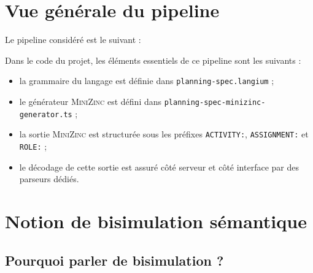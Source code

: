 \documentclass[12pt,a4paper]{article}
\newcommand{\DSL}{\textsc{PlanningSpec}}
\newcommand{\MZN}{\textsc{MiniZinc}}
\begin{document}
\section{Vue générale du pipeline}

Le pipeline considéré est le suivant :

\begin{center}
\end{center}

Dans le code du projet, les éléments essentiels de ce pipeline sont les suivants :

\begin{itemize}[leftmargin=1.2cm]
  \item la grammaire du langage est définie dans \texttt{planning-spec.langium} ;
  \item le générateur \MZN{} est défini dans \texttt{planning-spec-minizinc-generator.ts} ;
  \item la sortie \MZN{} est structurée sous les préfixes \texttt{ACTIVITY:}, \texttt{ASSIGNMENT:} et \texttt{ROLE:} ;
  \item le décodage de cette sortie est assuré côté serveur et côté interface par des parseurs dédiés.
\end{itemize}

\section{Notion de bisimulation sémantique}

\subsection{Pourquoi parler de bisimulation ?}
\end{document}
